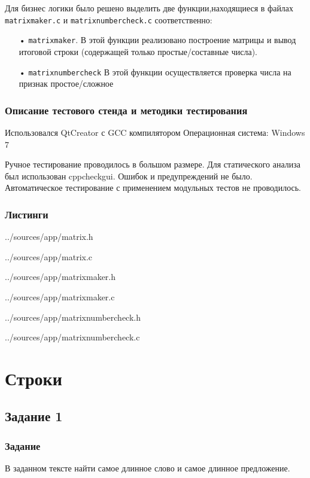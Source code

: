 \documentclass[12pt,a4paper]{report}
\begin{document}
Для бизнес логики было решено выделить две функции,находящиеся в файлах \verb-matrixmaker.c- и \verb-matrixnumbercheck.c- соответственно:
 \begin{enumerate}
\item[•] \verb-matrixmaker-. В этой функции реализовано построение матрицы и вывод итоговой строки (содержащей только простые/составные числа).
\item[•] \verb-matrixnumbercheck- В этой функции осуществляется проверка числа на признак простое/сложное
\end{enumerate}


\subsection{Описание тестового стенда и методики тестирования}
Использовался QtCreator с GCC компилятором
Операционная система: Windows 7


Ручное тестирование проводилось в большом размере.
Для статического анализа был использован cppcheckgui. Ошибок и предупреждений не было.
Автоматическое тестирование с применением модульных тестов не проводилось.

\subsection{Листинги}

{../sources/app/matrix.h}

{../sources/app/matrix.c}

{../sources/app/matrixmaker.h}

{../sources/app/matrixmaker.c}

{../sources/app/matrixnumbercheck.h}

{../sources/app/matrixnumbercheck.c}

\chapter{Строки}

\section{Задание 1}

\subsection{Задание}

В заданном тексте найти самое длинное слово и самое длинное предложение.
\end{document}
